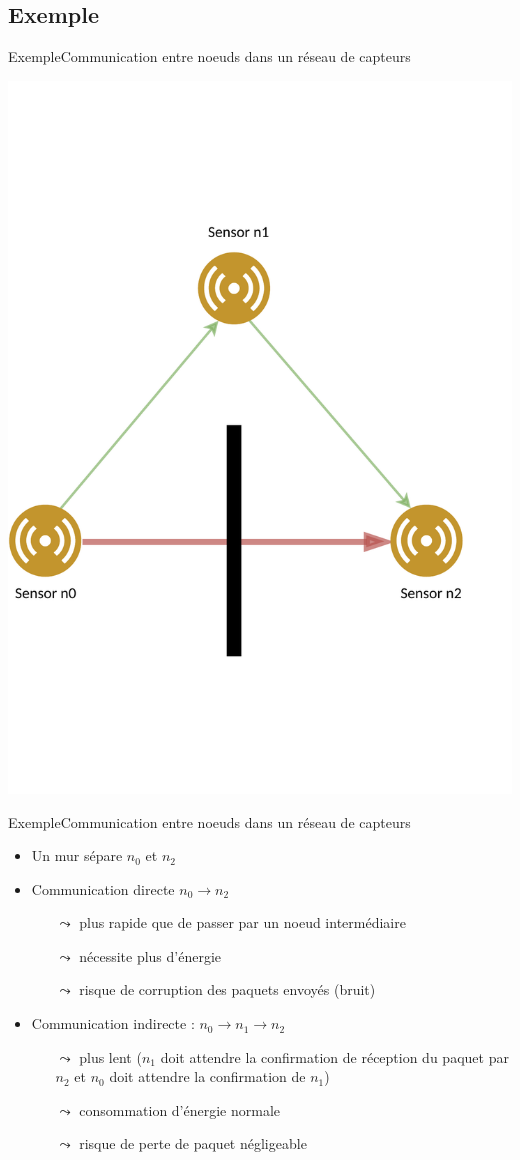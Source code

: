 \documentclass[compress]{beamer}
\theoremstyle{theorem}%
\begin{document}
\subsection{Exemple}
\begin{frame}{Exemple}{Communication entre noeuds dans un réseau de capteurs}
  \begin{center}
    \includegraphics[width=0.65\linewidth]{resources/example2.pdf}
  \end{center}
\end{frame}

\begin{frame}{Exemple}{Communication entre noeuds dans un réseau de capteurs}
      \begin{itemize}
        \item Un mur sépare $n_0$ et $n_2$
        \item Communication directe $n_0 \rightarrow n_2$
        \begin{itemize}
          \item[$\leadsto$] plus rapide que de passer par un noeud intermédiaire
          \item[$\leadsto$] nécessite plus d'énergie
          \item[$\leadsto$] risque de corruption des paquets envoyés (bruit)
        \end{itemize}
        \item Communication indirecte : $n_0 \rightarrow n_1 \rightarrow n_2$
        \begin{itemize}
          \item[$\leadsto$] plus lent ($n_1$ doit attendre la confirmation de réception du paquet par $n_2$ et $n_0$ doit attendre la confirmation de $n_1$)
          \item[$\leadsto$] consommation d'énergie normale
          \item[$\leadsto$] risque de perte de paquet négligeable
        \end{itemize}
      \end{itemize}
\end{frame}
\end{document}
